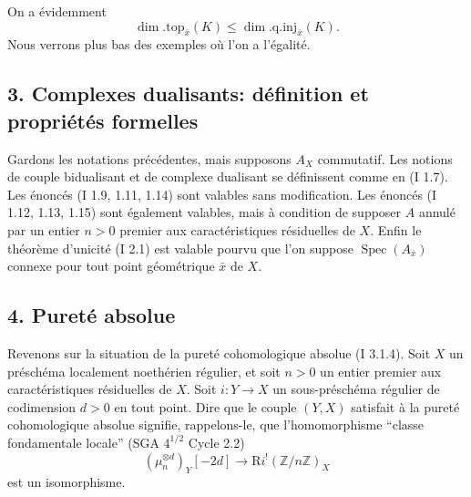 \documentclass[11pt]{article}
\DeclareMathOperator{\Spec}{Spec}
\newcommand{\R}{\mathrm{R}}
\newcommand{\Z}{\mathbb{Z}}
\providecommand{\R}{\mathrm R}
\providecommand{\Z}{\mathbb Z}
\providecommand{\Spec}{\operatorname{Spec}}
\providecommand{\Spec}{\operatorname{Spec}}
\providecommand{\Spec}{\operatorname{Spec}}
\providecommand{\Spec}{\operatorname{Spec}}
\begin{document}
On a évidemment
\[
        \dim.\mathrm{top}_{\bar{x}}(K)\leq \dim.\mathrm{q.inj}_{\bar{x}}(K).
\]
Nous verrons plus bas des exemples où l'on a l'égalité.

\subsection*{3. Complexes dualisants: définition et propriétés formelles}

Gardons les notations précédentes, mais supposons $A_X$ commutatif. Les notions de couple bidualisant et de complexe dualisant se définissent comme en (I 1.7). Les énoncés (I 1.9, 1.11, 1.14) sont valables sans modification. Les énoncés (I 1.12, 1.13, 1.15) sont également valables, mais à condition de supposer $A$ annulé par un entier $n>0$ premier aux caractéristiques résiduelles de $X$. Enfin le théorème d'unicité (I 2.1) est valable pourvu que l'on suppose $\Spec(A_{\bar{x}})$ connexe pour tout point géométrique $\bar{x}$ de $X$.

\subsection*{4. Pureté absolue}

Revenons sur la situation de la pureté cohomologique absolue (I 3.1.4). Soit $X$ un préschéma localement noethérien régulier, et soit $n>0$ un entier premier aux caractéristiques résiduelles de $X$. Soit $i:Y\to X$ un sous-préschéma régulier de codimension $d>0$ en tout point. Dire que le couple $(Y,X)$ satisfait à la pureté cohomologique absolue signifie, rappelons-le, que l'homomorphisme ``classe fondamentale locale'' (SGA $4^{1/2}$ Cycle 2.2)
\begin{equation}\tag{4.1}
        (\mu_n^{\otimes d})_Y[-2d]\longrightarrow \R i^!(\Z/n\Z)_X
\end{equation}
est un isomorphisme.
\end{document}

